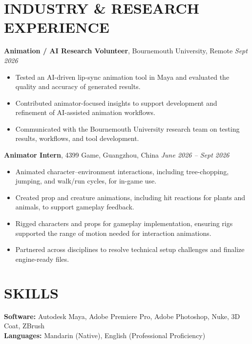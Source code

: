 \documentclass[11pt]{article}
\begin{document}
\section*{INDUSTRY \& RESEARCH EXPERIENCE}
\textbf{Animation / AI Research Volunteer}, Bournemouth University, Remote \hfill \textit{Sept 2026}
\begin{itemize}
    \item Tested an AI-driven lip-sync animation tool in Maya and evaluated the quality and accuracy of generated results.
    \item Contributed animator-focused insights to support development and refinement of AI-assisted animation workflows.
    \item Communicated with the Bournemouth University research team on testing results, workflows, and tool development.
\end{itemize}

\textbf{Animator Intern}, 4399 Game, Guangzhou, China \hfill \textit{June 2026 -- Sept 2026}
\begin{itemize}
    \item Animated character--environment interactions, including tree-chopping, jumping, and walk/run cycles, for in-game use.
    \item Created prop and creature animations, including hit reactions for plants and animals, to support gameplay feedback.
    \item Rigged characters and props for gameplay implementation, ensuring rigs supported the range of motion needed for interaction animations.
    \item Partnered across disciplines to resolve technical setup challenges and finalize engine-ready files.
\end{itemize}

\section*{SKILLS}
\textbf{Software:} Autodesk Maya, Adobe Premiere Pro, Adobe Photoshop, Nuke, 3D Coat, ZBrush\\
\textbf{Languages:} Mandarin (Native), English (Professional Proficiency)
\end{document}
